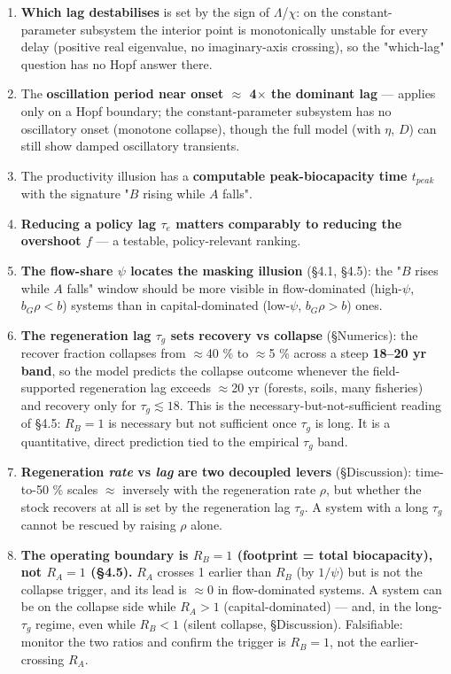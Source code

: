 \documentclass[11pt]{article}
\begin{document}
\begin{enumerate}
\item \textbf{Which lag destabilises} is set by the sign of $\Lambda{}$/$\chi{}$: on the constant-parameter subsystem the interior point is monotonically unstable for every delay (positive real eigenvalue, no imaginary-axis crossing), so the "which-lag" question has no Hopf answer there.
\item The \textbf{oscillation period near onset \ensuremath{\approx{}} 4\ensuremath{\times{}} the dominant lag} — applies only on a Hopf boundary; the constant-parameter subsystem has no oscillatory onset (monotone collapse), though the full model (with $\eta{}$, $D$) can still show damped oscillatory transients.
\item The productivity illusion has a \textbf{computable peak-biocapacity time $t_{peak}$} with the signature "$B$ rising while $A$ falls".
\item \textbf{Reducing a policy lag $\tau{}_{e}$ matters comparably to reducing the overshoot $f$} — a testable, policy-relevant ranking.
\item \textbf{The flow-share $\psi{}$ locates the masking illusion} (§4.1, §4.5): the "$B$ rises while $A$ falls" window should be more visible in flow-dominated (high-$\psi{}$, $b_{G}\rho{} < b$) systems than in capital-dominated (low-$\psi{}$, $b_{G}\rho{} > b$) ones.
\item \textbf{The regeneration lag $\tau{}_{g}$ sets recovery vs collapse} (§Numerics): the recover fraction collapses from \ensuremath{\approx{}}40 \% to \ensuremath{\approx{}}5 \% across a steep \textbf{18–20 yr band}, so the model predicts the collapse outcome whenever the field-supported regeneration lag exceeds \ensuremath{\approx{}}20 yr (forests, soils, many fisheries) and recovery only for $\tau{}_{g} \lesssim{} 18$. This is the necessary-but-not-sufficient reading of §4.5: $R_{B} = 1$ is necessary but not sufficient once $\tau{}_{g}$ is long. It is a quantitative, direct prediction tied to the empirical $\tau{}_{g}$ band.
\item \textbf{Regeneration \emph{rate} vs \emph{lag} are two decoupled levers} (§Discussion): time-to-50 \% scales \ensuremath{\approx{}} inversely with the regeneration rate $\rho{}$, but whether the stock recovers at all is set by the regeneration lag $\tau{}_{g}$. A system with a long $\tau{}_{g}$ cannot be rescued by raising $\rho{}$ alone.
\item \textbf{The operating boundary is $R_{B} = 1$ (footprint = total biocapacity), not $R_{A} = 1$ (§4.5).} $R_{A}$ crosses 1 earlier than $R_{B}$ (by $1/\psi{}$) but is not the collapse trigger, and its lead is \ensuremath{\approx{}}0 in flow-dominated systems. A system can be on the collapse side while $R_{A} > 1$ (capital-dominated) — and, in the long-$\tau{}_{g}$ regime, even while $R_{B} < 1$ (silent collapse, §Discussion). Falsifiable: monitor the two ratios and confirm the trigger is $R_{B} = 1$, not the earlier-crossing $R_{A}$.
\end{enumerate}
\end{document}
